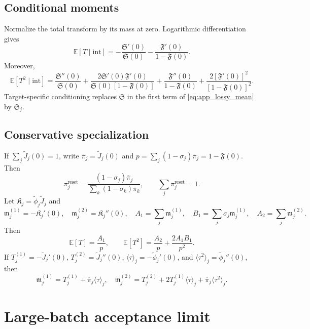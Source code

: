 \documentclass[pdflatex,sn-mathphys-num]{sn-jnl}
\numberwithin{equation}{section}
\theoremstyle{thmstyleone}%
\theoremstyle{definition}
\theoremstyle{remark}
\begin{document}
\begin{appendices}
\subsection{Conditional moments}

Normalize the total transform by its mass at zero. Logarithmic
differentiation gives
\begin{equation}
\mathbb E[T\mid\mathrm{int}]
=-\frac{\mathfrak S'(0)}{\mathfrak S(0)}
-\frac{\mathfrak F'(0)}{1-\mathfrak F(0)}.
\label{eq:app_lossy_mean}
\end{equation}
Moreover,
\[
\mathbb E[T^2\mid\mathrm{int}]
={}\frac{\mathfrak S''(0)}{\mathfrak S(0)}
+\frac{2\mathfrak S'(0)\mathfrak F'(0)}
{\mathfrak S(0)[1-\mathfrak F(0)]}
+\frac{\mathfrak F''(0)}{1-\mathfrak F(0)}
+\frac{2[\mathfrak F'(0)]^2}{[1-\mathfrak F(0)]^2}.
\]
Target-specific conditioning replaces $\mathfrak S$ in the first term of
\eqref{eq:app_lossy_mean} by $\mathfrak S_j$.

\subsection{Conservative specialization}

If $\sum_j\widetilde J_j(0)=1$, write
$\overline\pi_j=\widetilde J_j(0)$ and
$p=\sum_j(1-\sigma_j)\overline\pi_j=1-\mathfrak F(0)$.
Then
\[
\pi_j^{\mathrm{reset}}=
\frac{(1-\sigma_j)\overline\pi_j}
{\sum_k(1-\sigma_k)\overline\pi_k},\qquad
\sum_j\pi_j^{\mathrm{reset}}=1.
\]
Let $\mathfrak K_j=\widetilde\phi_j\widetilde J_j$ and
\[
\mathfrak m_j^{(1)}=-\mathfrak K_j'(0),\quad
\mathfrak m_j^{(2)}=\mathfrak K_j''(0),\quad
A_1=\sum_j\mathfrak m_j^{(1)},\quad
B_1=\sum_j\sigma_j\mathfrak m_j^{(1)},\quad
A_2=\sum_j\mathfrak m_j^{(2)}.
\]
Then
\[
\mathbb E[T]=\frac{A_1}{p},\qquad
\mathbb E[T^2]=\frac{A_2}{p}+\frac{2A_1B_1}{p^2}.
\]
If $T_j^{(1)}=-\widetilde J_j'(0)$,
$T_j^{(2)}=\widetilde J_j''(0)$,
$\langle\tau\rangle_j=-\widetilde\phi_j'(0)$, and
$\langle\tau^2\rangle_j=\widetilde\phi_j''(0)$, then
\begin{equation*}
\mathfrak m_j^{(1)}=T_j^{(1)}+\overline\pi_j\langle\tau\rangle_j,\quad
\mathfrak m_j^{(2)}=T_j^{(2)}+2T_j^{(1)}\langle\tau\rangle_j
+\overline\pi_j\langle\tau^2\rangle_j.
\end{equation*}

\section{Large-batch acceptance limit}
\label{app:large_batch}


\end{appendices}
\end{document}
